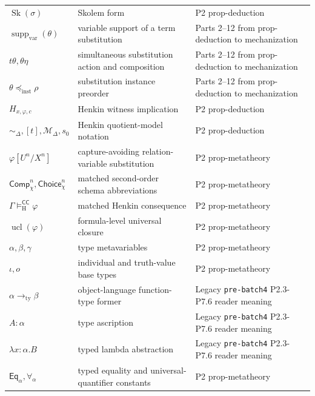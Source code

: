 \begin{longtable}{@{}p{}p{}p{}@{}}
\(\operatorname{Sk}(\sigma)\) & Skolem form & P2 prop-\allowbreak{}deduction \\
\(\operatorname{supp}_{\mathrm{var}}(\theta)\) & variable support of a term substitution & Parts 2--12 from prop-\allowbreak{}deduction to mechanization \\
\(t\theta,\allowbreak \theta\eta\) & simultaneous substitution action and composition & Parts 2--12 from prop-\allowbreak{}deduction to mechanization \\
\(\theta\preceq_{\mathrm{inst}}\rho\) & substitution instance preorder & Parts 2--12 from prop-\allowbreak{}deduction to mechanization \\
\(H_{x,\varphi,c}\) & Henkin witness implication & P2 prop-\allowbreak{}deduction \\
\(\sim_{\Delta},\allowbreak [t],\allowbreak \mathcal M_{\Delta},\allowbreak s_0\) & Henkin quotient-model notation & P2 prop-\allowbreak{}deduction \\
\(\varphi[U^n/X^n]\) & capture-avoiding relation-variable substitution & P2 prop-\allowbreak{}metatheory \\
\(\mathsf{Comp}_{\chi}^{n},\allowbreak \mathsf{Choice}_{\chi}^{n}\) & matched second-order schema abbreviations & P2 prop-\allowbreak{}metatheory \\
\(\Gamma\models_{\mathrm H}^{\mathsf{CC}}\varphi\) & matched Henkin consequence & P2 prop-\allowbreak{}metatheory \\
\(\operatorname{ucl}(\varphi)\) & formula-level universal closure & P2 prop-\allowbreak{}metatheory \\
\(\alpha,\allowbreak \beta,\allowbreak \gamma\) & type metavariables & P2 prop-\allowbreak{}metatheory \\
\(\iota,\allowbreak o\) & individual and truth-value base types & P2 prop-\allowbreak{}metatheory \\
\(\alpha\to_{\mathrm{ty}}\beta\) & object-language function-type former & Legacy \texttt{pre-\allowbreak{}batch4} P2.\allowbreak{}3-\allowbreak{}P7.\allowbreak{}6 reader meaning \\
\(A:\alpha\) & type ascription & Legacy \texttt{pre-\allowbreak{}batch4} P2.\allowbreak{}3-\allowbreak{}P7.\allowbreak{}6 reader meaning \\
\(\lambda x{:}\alpha.B\) & typed lambda abstraction & Legacy \texttt{pre-\allowbreak{}batch4} P2.\allowbreak{}3-\allowbreak{}P7.\allowbreak{}6 reader meaning \\
\(\mathsf{Eq}_{\alpha},\allowbreak \forall_{\alpha}\) & typed equality and universal-quantifier constants & P2 prop-\allowbreak{}metatheory \\

\end{longtable}
